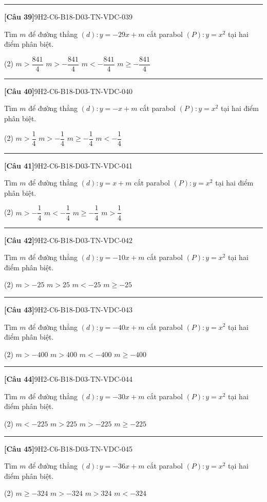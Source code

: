 \documentclass[12pt,a4paper]{article}
\newif\ifloigiai
\newenvironment{cauhoi}[2]{%
  \par\medskip\noindent\rule{\textwidth}{0.4pt}\par\nopagebreak
  \noindent\textbf{[#1]}\hfill{\scriptsize\ttfamily #2}\par\nopagebreak\smallskip}{\par}
\newcommand{\dapan}[1]{\ifloigiai\par\smallskip\noindent\textit{Đáp án:} \textbf{#1}\par\fi}
\begin{document}
\begin{cauhoi}{Câu 39}{9H2-C6-B18-D03-TN-VDC-039}
Tìm $m$ để đường thẳng $(d): y=-29x+m$ cắt parabol $(P): y=x^{2}$ tại hai điểm phân biệt.
\begin{tasks}(2)
\task $m>\dfrac{841}{4}$
\task $m>-\dfrac{841}{4}$
\task $m<-\dfrac{841}{4}$
\task $m\ge -\dfrac{841}{4}$
\end{tasks}
\dapan{B}
\end{cauhoi}
\begin{cauhoi}{Câu 40}{9H2-C6-B18-D03-TN-VDC-040}
Tìm $m$ để đường thẳng $(d): y=-x+m$ cắt parabol $(P): y=x^{2}$ tại hai điểm phân biệt.
\begin{tasks}(2)
\task $m>\dfrac{1}{4}$
\task $m>-\dfrac{1}{4}$
\task $m\ge -\dfrac{1}{4}$
\task $m<-\dfrac{1}{4}$
\end{tasks}
\dapan{B}
\end{cauhoi}
\begin{cauhoi}{Câu 41}{9H2-C6-B18-D03-TN-VDC-041}
Tìm $m$ để đường thẳng $(d): y=x+m$ cắt parabol $(P): y=x^{2}$ tại hai điểm phân biệt.
\begin{tasks}(2)
\task $m>-\dfrac{1}{4}$
\task $m<-\dfrac{1}{4}$
\task $m\ge -\dfrac{1}{4}$
\task $m>\dfrac{1}{4}$
\end{tasks}
\dapan{A}
\end{cauhoi}
\begin{cauhoi}{Câu 42}{9H2-C6-B18-D03-TN-VDC-042}
Tìm $m$ để đường thẳng $(d): y=-10x+m$ cắt parabol $(P): y=x^{2}$ tại hai điểm phân biệt.
\begin{tasks}(2)
\task $m>-25$
\task $m>25$
\task $m<-25$
\task $m\ge -25$
\end{tasks}
\dapan{A}
\end{cauhoi}
\begin{cauhoi}{Câu 43}{9H2-C6-B18-D03-TN-VDC-043}
Tìm $m$ để đường thẳng $(d): y=-40x+m$ cắt parabol $(P): y=x^{2}$ tại hai điểm phân biệt.
\begin{tasks}(2)
\task $m>-400$
\task $m>400$
\task $m<-400$
\task $m\ge -400$
\end{tasks}
\dapan{A}
\end{cauhoi}
\begin{cauhoi}{Câu 44}{9H2-C6-B18-D03-TN-VDC-044}
Tìm $m$ để đường thẳng $(d): y=-30x+m$ cắt parabol $(P): y=x^{2}$ tại hai điểm phân biệt.
\begin{tasks}(2)
\task $m<-225$
\task $m>225$
\task $m>-225$
\task $m\ge -225$
\end{tasks}
\dapan{C}
\end{cauhoi}
\begin{cauhoi}{Câu 45}{9H2-C6-B18-D03-TN-VDC-045}
Tìm $m$ để đường thẳng $(d): y=-36x+m$ cắt parabol $(P): y=x^{2}$ tại hai điểm phân biệt.
\begin{tasks}(2)
\task $m\ge -324$
\task $m>-324$
\task $m>324$
\task $m<-324$
\end{tasks}
\dapan{B}
\end{cauhoi}
\end{document}
